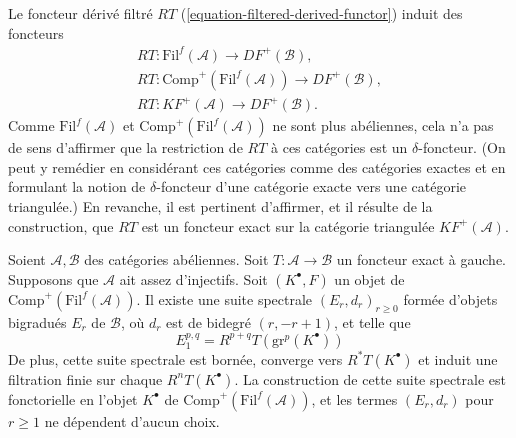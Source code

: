 \medskip\noindent
Le foncteur dérivé filtré $RT$
(\ref{equation-filtered-derived-functor}) induit des foncteurs
$$
\begin{matrix}
RT : \text{Fil}^f(\mathcal{A}) \to DF^{+}(\mathcal{B}), \\
RT : \text{Comp}^{+}(\text{Fil}^f(\mathcal{A})) \to DF^{+}(\mathcal{B}), \\
RT : KF^{+}(\mathcal{A}) \to DF^{+}(\mathcal{B}).
\end{matrix}
$$
Comme $\text{Fil}^f(\mathcal{A})$ et
$\text{Comp}^{+}(\text{Fil}^f(\mathcal{A}))$ ne sont plus abéliennes, cela
n'a pas de sens d'affirmer que la restriction de $RT$ à ces catégories est
un $\delta$-foncteur. (On peut y remédier en considérant ces catégories comme
des catégories exactes et en formulant la notion de $\delta$-foncteur d'une
catégorie exacte vers une catégorie triangulée.) En revanche, il est pertinent
d'affirmer, et il résulte de la construction, que $RT$ est un foncteur exact
sur la catégorie triangulée $KF^{+}(\mathcal{A})$.

\begin{lemma}
\label{lemma-ss-filtered-derived}
Soient $\mathcal{A}, \mathcal{B}$ des catégories abéliennes. Soit
$T : \mathcal{A} \to \mathcal{B}$ un foncteur exact à gauche.
Supposons que $\mathcal{A}$ ait assez d'injectifs.
Soit $(K^\bullet, F)$ un objet de
$\text{Comp}^{+}(\text{Fil}^f(\mathcal{A}))$.
Il existe une suite spectrale $(E_r, d_r)_{r\geq 0}$ formée d'objets
bigradués $E_r$ de $\mathcal{B}$, où $d_r$ est de bidegré $(r, - r + 1)$,
et telle que
$$
E_1^{p, q} = R^{p + q}T(\text{gr}^p(K^\bullet))
$$
De plus, cette suite spectrale est bornée, converge vers
$R^*T(K^\bullet)$ et induit une filtration finie sur chaque
$R^nT(K^\bullet)$. La construction de cette suite spectrale est fonctorielle
en l'objet $K^\bullet$ de
$\text{Comp}^{+}(\text{Fil}^f(\mathcal{A}))$, et les termes $(E_r, d_r)$ pour
$r \geq 1$ ne dépendent d'aucun choix.
\end{lemma}

